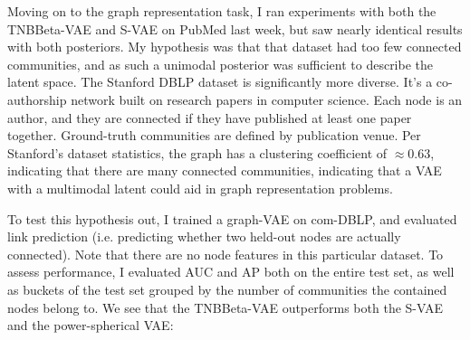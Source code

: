 Moving on to the graph representation task, I ran experiments with both the TNBBeta-VAE and S-VAE on
PubMed last week, but saw nearly identical results with both posteriors. My hypothesis was that that
dataset had too few connected communities, and as such a unimodal posterior was sufficient to describe
the latent space. The Stanford DBLP dataset is significantly more diverse. It's a co-authorship network
built on research papers in computer science. Each node is an author, and they are connected if they
have published at least one paper together. Ground-truth communities are defined by publication venue.
Per Stanford's dataset statistics, the graph has a clustering coefficient of $\approx 0.63$, indicating
that there are many connected communities, indicating that a VAE with a multimodal latent could aid in
graph representation problems.

To test this hypothesis out, I trained a graph-VAE on com-DBLP, and evaluated link prediction (i.e.
predicting whether two held-out nodes are actually connected). Note that there are no node features in this
particular dataset. To assess performance, I evaluated AUC and AP both on the entire test set, as well as
buckets of the test set grouped by the number of communities the contained nodes belong to. We see that
the TNBBeta-VAE outperforms both the S-VAE and the power-spherical VAE:

\begin{table}[H]
    \centering
    \caption{Link-prediction AUC/AP (mean $\pm$ std, 5 seeds), aggregated over the whole test set
    and broken down by a bridge node's primary vs.\ secondary community. $p$-values are Welch's
    $t$-test.}
    \label{tab:dblp-headline}
\end{table}

